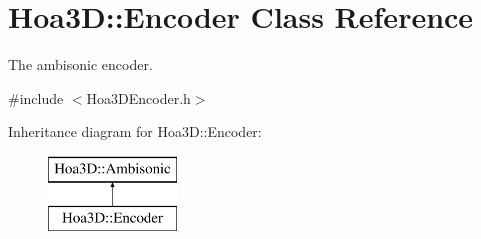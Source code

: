 \hypertarget{class_hoa3_d_1_1_encoder}{\section{Hoa3\-D\-:\-:Encoder Class Reference}
\label{class_hoa3_d_1_1_encoder}
}


The ambisonic encoder.  




{\ttfamily \#include $<$Hoa3\-D\-Encoder.\-h$>$}

Inheritance diagram for Hoa3\-D\-:\-:Encoder\-:\begin{figure}[H]
\begin{center}
\leavevmode
\includegraphics[height=2.000000cm]{class_hoa3_d_1_1_encoder}
\end{center}
\end{figure}
